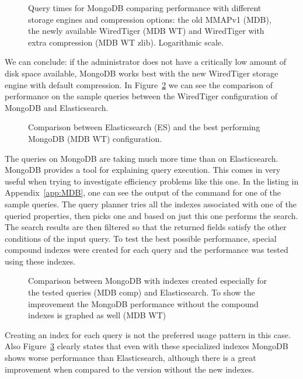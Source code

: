 \begin{figure}[h]
	\centering
	
	\caption{Query times for MongoDB comparing performance with different storage engines and compression 
	options: the old MMAPv1 (MDB), the newly available WiredTiger (MDB WT) and WiredTiger with extra compression 
	(MDB WT zlib). Logarithmic scale.}
	\label{fig:MDBcomparison}
\end{figure}

We can conclude: if the administrator does not have a critically low amount of disk space available, MongoDB
works best with the new WiredTiger storage engine with default compression. In Figure~\ref{fig:DBscomparison} we 
can see the comparison of performance on the sample queries between the WiredTiger configuration of MongoDB and 
Elasticsearch. 

\begin{figure}[h]
	\centering
	
	\caption{Comparison between Elasticsearch (ES) and the best performing MongoDB (MDB WT) configuration.}
	\label{fig:DBscomparison}
\end{figure}

The queries on MongoDB are taking much more time than on Elasticsearch. MongoDB provides
a tool for explaining query execution. This comes in very useful when trying to investigate efficiency problems
like this one. In the listing in Appendix~\ref{app:MDB}, one can see the output of the command for one of the 
sample queries. The query planner tries all the indexes associated with one of the queried properties, then 
picks one and based on just this one performs the search. The search results are then filtered so that the 
returned 
fields satisfy the other conditions of the input query. To test the best possible performance, special compound 
indexes were created for each query and the performance was tested using these indexes. 

\begin{figure}[h]
	\centering
	
	\caption{Comparison between MongoDB with indexes created especially for the tested queries (MDB comp) and 
	Elasticsearch. To show the improvement the MongoDB performance without the compound indexes is graphed as well
	(MDB WT)}
	\label{fig:MDBcompound}
\end{figure}

Creating an index for each query is not the preferred usage pattern in this case. Also Figure~\ref{fig:MDBcompound} 
clearly states that even with these specialized indexes MongoDB shows worse performance 
than Elasticsearch, although there is a great improvement when compared to the version without the new indexes.  

